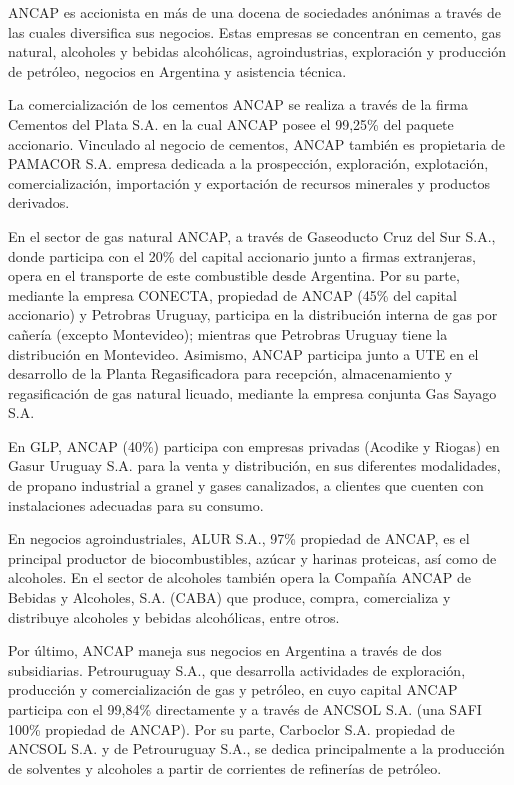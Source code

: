 \documentclass[
  12pt,
  spanish,
]{book}
\begin{document}
ANCAP es accionista en más de una docena de sociedades anónimas a través
de las cuales diversifica sus negocios. Estas empresas se concentran en
cemento, gas natural, alcoholes y bebidas alcohólicas, agroindustrias,
exploración y producción de petróleo, negocios en Argentina y asistencia
técnica.

La comercialización de los cementos ANCAP se realiza a través de la
firma Cementos del Plata S.A. en la cual ANCAP posee el 99,25\% del
paquete accionario. Vinculado al negocio de cementos, ANCAP también es
propietaria de PAMACOR S.A. empresa dedicada a la prospección,
exploración, explotación, comercialización, importación y exportación de
recursos minerales y productos derivados.

En el sector de gas natural ANCAP, a través de Gaseoducto Cruz del Sur
S.A., donde participa con el 20\% del capital accionario junto a firmas
extranjeras, opera en el transporte de este combustible desde Argentina.
Por su parte, mediante la empresa CONECTA, propiedad de ANCAP (45\% del
capital accionario) y Petrobras Uruguay, participa en la distribución
interna de gas por cañería (excepto Montevideo); mientras que Petrobras
Uruguay tiene la distribución en Montevideo. Asimismo, ANCAP participa
junto a UTE en el desarrollo de la Planta Regasificadora para recepción,
almacenamiento y regasificación de gas natural licuado, mediante la
empresa conjunta Gas Sayago S.A.

En GLP, ANCAP (40\%) participa con empresas privadas (Acodike y Riogas)
en Gasur Uruguay S.A. para la venta y distribución, en sus diferentes
modalidades, de propano industrial a granel y gases canalizados, a
clientes que cuenten con instalaciones adecuadas para su consumo.

En negocios agroindustriales, ALUR S.A., 97\% propiedad de ANCAP, es el
principal productor de biocombustibles, azúcar y harinas proteicas, así
como de alcoholes. En el sector de alcoholes también opera la Compañía
ANCAP de Bebidas y Alcoholes, S.A. (CABA) que produce, compra,
comercializa y distribuye alcoholes y bebidas alcohólicas, entre otros.

Por último, ANCAP maneja sus negocios en Argentina a través de dos
subsidiarias. Petrouruguay S.A., que desarrolla actividades de
exploración, producción y comercialización de gas y petróleo, en cuyo
capital ANCAP participa con el 99,84\% directamente y a través de ANCSOL
S.A. (una SAFI 100\% propiedad de ANCAP). Por su parte, Carboclor S.A.
propiedad de ANCSOL S.A. y de Petrouruguay S.A., se dedica
principalmente a la producción de solventes y alcoholes a partir de
corrientes de refinerías de petróleo.
\end{document}
